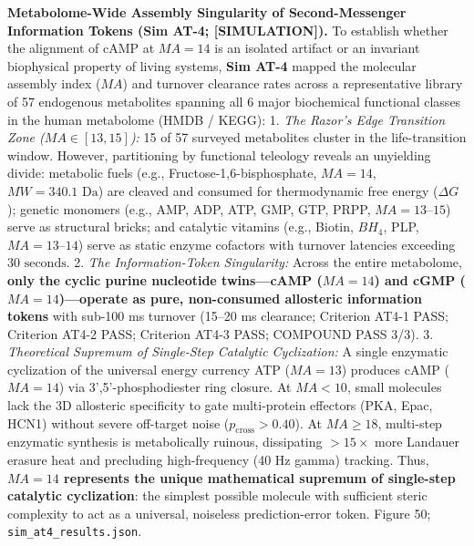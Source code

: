 \documentclass[
]{article}
\begin{document}
\textbf{Metabolome-Wide Assembly Singularity of Second-Messenger
Information Tokens (Sim AT-4; {[}SIMULATION{]}).} To establish whether
the alignment of cAMP at \(MA = 14\) is an isolated artifact or an
invariant biophysical property of living systems, \textbf{Sim AT-4}
mapped the molecular assembly index (\(MA\)) and turnover clearance
rates across a representative library of 57 endogenous metabolites
spanning all 6 major biochemical functional classes in the human
metabolome (HMDB / KEGG): 1. \emph{The Razor's Edge Transition Zone
(\(MA \in [13, 15]\)):} 15 of 57 surveyed metabolites cluster in the
life-transition window. However, partitioning by functional teleology
reveals an unyielding divide: metabolic fuels (e.g.,
Fructose-1,6-bisphosphate, \(MA = 14\), \(MW = 340.1\text{ Da}\)) are
cleaved and consumed for thermodynamic free energy (\(\Delta G\));
genetic monomers (e.g., AMP, ADP, ATP, GMP, GTP, PRPP,
\(MA = 13\text{–}15\)) serve as structural bricks; and catalytic
vitamins (e.g., Biotin, \(BH_4\), PLP, \(MA = 13\text{–}14\)) serve as
static enzyme cofactors with turnover latencies exceeding
\(30\text{ seconds}\). 2. \emph{The Information-Token Singularity:}
Across the entire metabolome, \textbf{only the cyclic purine nucleotide
twins---cAMP (\(MA = 14\)) and cGMP (\(MA = 14\))---operate as pure,
non-consumed allosteric information tokens} with sub-100 ms turnover
(15--20 ms clearance; Criterion AT4-1 PASS; Criterion AT4-2 PASS;
Criterion AT4-3 PASS; COMPOUND PASS 3/3). 3. \emph{Theoretical Supremum
of Single-Step Catalytic Cyclization:} A single enzymatic cyclization of
the universal energy currency ATP (\(MA=13\)) produces cAMP (\(MA=14\))
via 3',5'-phosphodiester ring closure. At \(MA < 10\), small molecules
lack the 3D allosteric specificity to gate multi-protein effectors (PKA,
Epac, HCN1) without severe off-target noise
(\(p_{\text{cross}} > 0.40\)). At \(MA \ge 18\), multi-step enzymatic
synthesis is metabolically ruinous, dissipating \(>15\times\) more
Landauer erasure heat and precluding high-frequency (40 Hz gamma)
tracking. Thus, \textbf{\(MA = 14\) represents the unique mathematical
supremum of single-step catalytic cyclization}: the simplest possible
molecule with sufficient steric complexity to act as a universal,
noiseless prediction-error token. Figure 50;
\texttt{sim\_at4\_results.json}.
\end{document}
